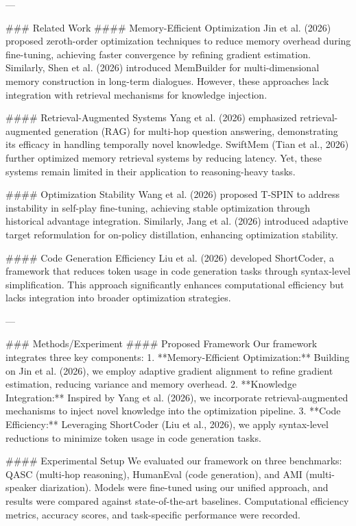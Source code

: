 ---

### Related Work  
#### Memory-Efficient Optimization  
Jin et al. (2026) proposed zeroth-order optimization techniques to reduce memory overhead during fine-tuning, achieving faster convergence by refining gradient estimation. Similarly, Shen et al. (2026) introduced MemBuilder for multi-dimensional memory construction in long-term dialogues. However, these approaches lack integration with retrieval mechanisms for knowledge injection.  

#### Retrieval-Augmented Systems  
Yang et al. (2026) emphasized retrieval-augmented generation (RAG) for multi-hop question answering, demonstrating its efficacy in handling temporally novel knowledge. SwiftMem (Tian et al., 2026) further optimized memory retrieval systems by reducing latency. Yet, these systems remain limited in their application to reasoning-heavy tasks.  

#### Optimization Stability  
Wang et al. (2026) proposed T-SPIN to address instability in self-play fine-tuning, achieving stable optimization through historical advantage integration. Similarly, Jang et al. (2026) introduced adaptive target reformulation for on-policy distillation, enhancing optimization stability.  

#### Code Generation Efficiency  
Liu et al. (2026) developed ShortCoder, a framework that reduces token usage in code generation tasks through syntax-level simplification. This approach significantly enhances computational efficiency but lacks integration into broader optimization strategies.  

---

### Methods/Experiment  
#### Proposed Framework  
Our framework integrates three key components:  
1. **Memory-Efficient Optimization:** Building on Jin et al. (2026), we employ adaptive gradient alignment to refine gradient estimation, reducing variance and memory overhead.  
2. **Knowledge Integration:** Inspired by Yang et al. (2026), we incorporate retrieval-augmented mechanisms to inject novel knowledge into the optimization pipeline.  
3. **Code Efficiency:** Leveraging ShortCoder (Liu et al., 2026), we apply syntax-level reductions to minimize token usage in code generation tasks.  

#### Experimental Setup  
We evaluated our framework on three benchmarks: QASC (multi-hop reasoning), HumanEval (code generation), and AMI (multi-speaker diarization). Models were fine-tuned using our unified approach, and results were compared against state-of-the-art baselines. Computational efficiency metrics, accuracy scores, and task-specific performance were recorded.  

